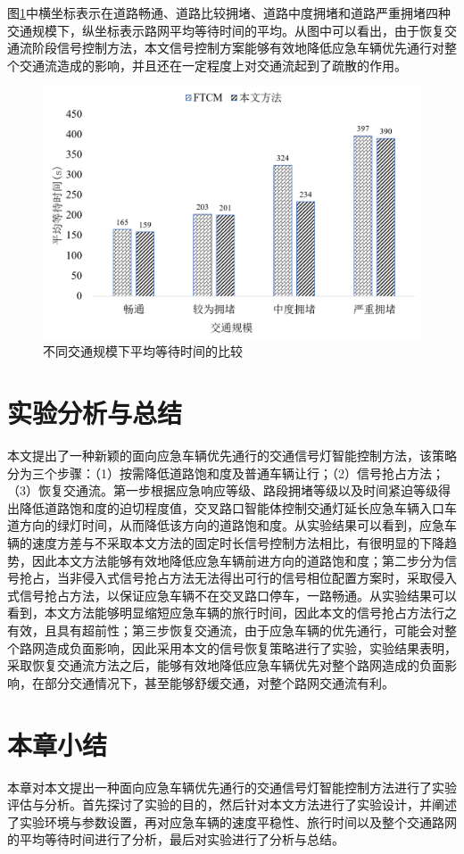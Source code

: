 图\ref{fig:awt_conclude}中横坐标表示在道路畅通、道路比较拥堵、道路中度拥堵和道路严重拥堵四种交通规模下，纵坐标表示路网平均等待时间的平均。从图中可以看出，由于恢复交通流阶段信号控制方法，本文信号控制方案能够有效地降低应急车辆优先通行对整个交通流造成的影响，并且还在一定程度上对交通流起到了疏散的作用。

\begin{figure}[H]
	\centering
	\includegraphics[width=\linewidth]{figures/awt_conclude.png}
	\caption{不同交通规模下平均等待时间的比较}
	\label{fig:awt_conclude}
\end{figure}

\section{实验分析与总结}
本文提出了一种新颖的面向应急车辆优先通行的交通信号灯智能控制方法，该策略分为三个步骤：（1）按需降低道路饱和度及普通车辆让行；（2）信号抢占方法；（3）恢复交通流。第一步根据应急响应等级、路段拥堵等级以及时间紧迫等级得出降低道路饱和度的迫切程度值，交叉路口智能体控制交通灯延长应急车辆入口车道方向的绿灯时间，从而降低该方向的道路饱和度。从实验结果可以看到，应急车辆的速度方差与不采取本文方法的固定时长信号控制方法相比，有很明显的下降趋势，因此本文方法能够有效地降低应急车辆前进方向的道路饱和度；第二步分为信号抢占，当非侵入式信号抢占方法无法得出可行的信号相位配置方案时，采取侵入式信号抢占方法，以保证应急车辆不在交叉路口停车，一路畅通。从实验结果可以看到，本文方法能够明显缩短应急车辆的旅行时间，因此本文的信号抢占方法行之有效，且具有超前性；第三步恢复交通流，由于应急车辆的优先通行，可能会对整个路网造成负面影响，因此采用本文的信号恢复策略进行了实验，实验结果表明，采取恢复交通流方法之后，能够有效地降低应急车辆优先对整个路网造成的负面影响，在部分交通情况下，甚至能够舒缓交通，对整个路网交通流有利。
\section{本章小结}
本章对本文提出一种面向应急车辆优先通行的交通信号灯智能控制方法进行了实验评估与分析。首先探讨了实验的目的，然后针对本文方法进行了实验设计，并阐述了实验环境与参数设置，再对应急车辆的速度平稳性、旅行时间以及整个交通路网的平均等待时间进行了分析，最后对实验进行了分析与总结。
